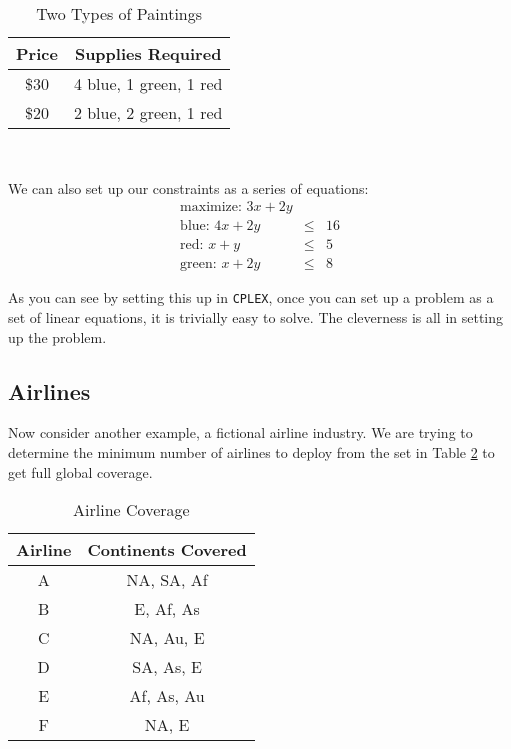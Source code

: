 \documentclass[12pt,letter]{article}
\begin{document}
\begin{table}[h!]\centering
 \caption{Two Types of Paintings}
\label{paintings}
\begin{tabular}{cc}\hline
Price & Supplies Required \\
\hline
\$30 & 4 blue, 1 green, 1 red \\
\$20 & 2 blue, 2 green, 1 red \\
\hline
\end{tabular} \\
\end{table}

We can also set up our constraints as a series of equations:
\begin{eqnarray*}
\text{maximize:  } 3x + 2y \\
\text{blue:  } 4x + 2y  &\leq& 16 \\
\text{red:  } x + y  &\leq& 5 \\
\text{green:  } x + 2y  &\leq& 8 
\end{eqnarray*}

As you can see by setting this up in \texttt{CPLEX}, once you can set
up a problem as a set of linear equations, it is trivially easy to
solve. The cleverness is all in setting up the problem.\footnotemark
{}


\subsection{Airlines}
Now consider another example, a fictional airline industry. We are
trying to determine the minimum number of airlines to deploy from the
set in Table \ref{airlines} to get full global coverage. \footnotemark
{}

\begin{table}[h!]\centering
 \caption{Airline Coverage}
\label{airlines}
\begin{tabular}{c|c}\hline
Airline & Continents Covered \\
\hline
A & NA, SA, Af \\
B & E, Af, As \\
C & NA, Au, E \\
D & SA, As, E \\
E & Af, As, Au \\
F & NA, E \\
\hline
\end{tabular} \\
\end{table}
\end{document}
